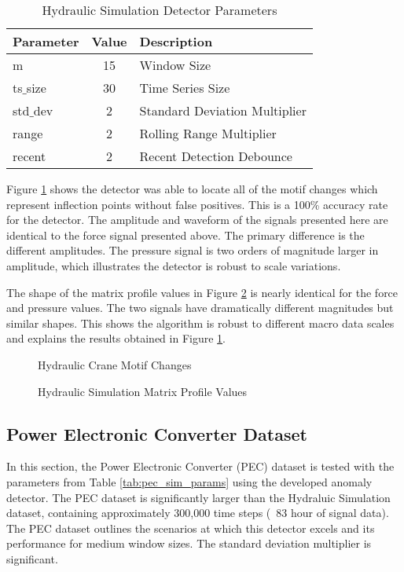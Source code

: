 \begin{table}[H]
\caption{Hydraulic Simulation Detector Parameters}
\begin{tabular}{|l|c|l|}
    \hline
	\textbf{Parameter} & \textbf{Value} & \textbf{Description} \\ \hline
	m & 15 & Window Size \\ \hline
	ts$\_$size & 30 & Time Series Size \\ \hline
	std$\_$dev & 2 & Standard Deviation Multiplier \\ \hline
	range & 2 & Rolling Range Multiplier\\ \hline
	recent & 2 & Recent Detection Debounce\\ \hline
\end{tabular}
\label{tab:hydraulic_sim_params}
\end{table}

Figure \ref{fig:hydraulic_result_fp} shows the detector was able to locate all of the motif changes which represent inflection points without false positives. This is a 100\% accuracy rate for the detector. The amplitude and waveform of the signals presented here are identical to the force signal presented above. The primary difference is the different amplitudes. The pressure signal is two orders of magnitude larger in amplitude, which illustrates the detector is robust to scale variations.

The shape of the matrix profile values in Figure \ref{fig:hydraulic_mp_hist_fp} is nearly identical for the force and pressure values. The two signals have dramatically different magnitudes but similar shapes. This shows the algorithm is robust to different macro data scales and explains the results obtained in Figure \ref{fig:hydraulic_result_fp}.

\begin{figure}[H]
    
    \caption{Hydraulic Crane Motif Changes}
    \label{fig:hydraulic_result_fp}
\end{figure}


\begin{figure}[H]
    
    \caption{Hydraulic Simulation Matrix Profile Values}
    \label{fig:hydraulic_mp_hist_fp}
\end{figure}


\subsection{Power Electronic Converter Dataset}
\label{ref_results_pec_sim}
In this section, the Power Electronic Converter (PEC) dataset is tested with the parameters from Table \ref{tab:pec_sim_params} using the developed anomaly detector. The PEC dataset is significantly larger than the Hydraluic Simulation dataset, containing approximately 300,000 time steps (~83 hour of signal data). The PEC dataset outlines the scenarios at which this detector excels and its performance for medium window sizes. The standard deviation multiplier is significant.

